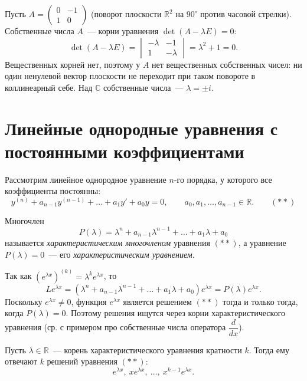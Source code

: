 \documentclass[12pt]{article}
\begin{document}
	\begin{example}
		Пусть $A = \begin{pmatrix} 0 & -1 \\ 1 & 0 \end{pmatrix}$ (поворот плоскости $\mathbb{R}^2$ на $90^\circ$ против часовой стрелки). Собственные числа $A$~--- корни уравнения $\det(A - \lambda E) = 0$:
		\[
			\det(A - \lambda E) = \begin{vmatrix} -\lambda & -1 \\ 1 & -\lambda \end{vmatrix} = \lambda^2 + 1 = 0.
		\]
		Вещественных корней нет, поэтому у $A$ нет вещественных собственных чисел: ни один ненулевой вектор плоскости не переходит при таком повороте в коллинеарный себе. Над $\mathbb{C}$ собственные числа~--- $\lambda = \pm i$.
	\end{example}

	\section{Линейные однородные уравнения с постоянными коэффициентами}

	\noindent
	Рассмотрим линейное однородное уравнение $n$-го порядка, у которого все коэффициенты постоянны:
	\[
		y^{(n)} + a_{n-1} y^{(n-1)} + \dots + a_1 y' + a_0 y = 0, \qquad a_0, a_1, \dots, a_{n-1} \in \mathbb{R}. \qquad (**)
	\]

	\begin{definition}
		Многочлен
		\[
			P(\lambda) = \lambda^n + a_{n-1} \lambda^{n-1} + \dots + a_1 \lambda + a_0
		\]
		называется \emph{характеристическим многочленом} уравнения $(**)$, а уравнение $P(\lambda) = 0$~--- его \emph{характеристическим уравнением}.
	\end{definition}

	\begin{note}
		Так как $\left( e^{\lambda x} \right)^{(k)} = \lambda^k e^{\lambda x}$, то
		\[
			L e^{\lambda x} = \left( \lambda^n + a_{n-1} \lambda^{n-1} + \dots + a_1 \lambda + a_0 \right) e^{\lambda x} = P(\lambda) e^{\lambda x}.
		\]
		Поскольку $e^{\lambda x} \ne 0$, функция $e^{\lambda x}$ является решением $(**)$ тогда и только тогда, когда $P(\lambda) = 0$. Поэтому решения ищутся через корни характеристического уравнения (ср. с примером про собственные числа оператора $\dfrac{d}{dx}$).
	\end{note}

	\begin{theorem}
		Пусть $\lambda \in \mathbb{R}$~--- корень характеристического уравнения кратности $k$. Тогда ему отвечают $k$ решений уравнения $(**)$:
		\[
			e^{\lambda x}, \ x e^{\lambda x}, \ \dots, \ x^{k-1} e^{\lambda x}.
		\]
	\end{theorem}
\end{document}
